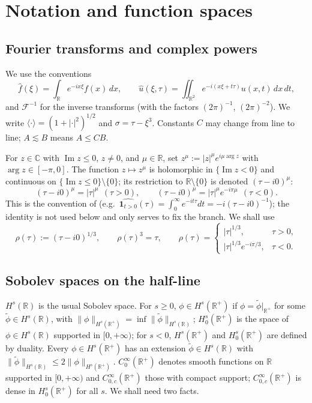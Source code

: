 \documentclass[10pt,reqno]{amsart}
\theoremstyle{remark}
\numberwithin{equation}{section}
\newcommand{\R}{\mathbb R}
\newcommand{\Com}{\mathbb{C}}
\newcommand{\ima}{\operatorname{Im}}
\newcommand{\lan}{\langle}
\newcommand{\ran}{\rangle}
\newcommand{\F}{\mathcal{F}}
\newcommand{\sig}{\sigma}
\begin{document}
\section{Notation and function spaces}\label{sec:spaces}

\subsection{Fourier transforms and complex powers}
We use the conventions
$$\widehat f(\xi)=\int_\R e^{-ix\xi}f(x)\,dx,\qquad \widehat u(\xi,\tau)=\iint_{\R^2}e^{-i(x\xi+t\tau)}u(x,t)\,dx\,dt,$$
and $\F^{-1}$ for the inverse transforms (with the factors $(2\pi)^{-1}$, $(2\pi)^{-2}$). We write $\lan\cdot\ran=(1+|\cdot|^2)^{1/2}$ and $\sig=\tau-\xi^3$. Constants $C$ may change from line to line; $A\lesssim B$ means $A\le CB$.

For $z\in\Com$ with $\ima z\le0$, $z\ne0$, and $\mu\in\R$, set $z^\mu:=|z|^\mu e^{i\mu\arg z}$ with $\arg z\in[-\pi,0]$. The function $z\mapsto z^\mu$ is holomorphic in $\{\ima z<0\}$ and continuous on $\{\ima z\le0\}\setminus\{0\}$; its restriction to $\R\setminus\{0\}$ is denoted $(\tau-i0)^\mu$:
\begin{equation}\label{eq:power}
(\tau-i0)^\mu=|\tau|^\mu\ \ (\tau>0),\qquad (\tau-i0)^\mu=|\tau|^\mu e^{-i\pi\mu}\ \ (\tau<0).
\end{equation}
This is the convention of \cite[(2.2)]{Holmer} (e.g.\ $\widehat{\mathbf 1_{t>0}}(\tau)=\int_0^\infty e^{-it\tau}dt=-i(\tau-i0)^{-1}$); the identity is not used below and only serves to fix the branch. We shall use
\begin{equation}\label{eq:rho}
\rho(\tau):=(\tau-i0)^{1/3},\qquad \rho(\tau)^3=\tau,\qquad \rho(\tau)=\begin{cases}|\tau|^{1/3}, & \tau>0,\\ |\tau|^{1/3}e^{-i\pi/3}, & \tau<0.\end{cases}
\end{equation}

\subsection{Sobolev spaces on the half-line}
 $H^s(\R)$ is the usual Sobolev space. For $s\ge0$, $\phi\in H^s(\R^+)$ if $\phi=\tilde\phi|_{\R^+}$ for some $\tilde\phi\in H^s(\R)$, with $\|\phi\|_{H^s(\R^+)}=\inf\|\tilde\phi\|_{H^s(\R)}$; $H^s_0(\R^+)$ is the space of $\phi\in H^s(\R)$ supported in $[0,+\infty)$; for $s<0$, $H^s(\R^+)$ and $H^s_0(\R^+)$ are defined by duality. Every $\phi\in H^s(\R^+)$ has an extension $\tilde\phi\in H^s(\R)$ with $\|\tilde\phi\|_{H^s(\R)}\le 2\|\phi\|_{H^s(\R^+)}$. $C_0^\infty(\R^+)$ denotes smooth functions on $\R$ supported in $[0,+\infty)$ and $C^\infty_{0,c}(\R^+)$ those with compact support; $C^\infty_{0,c}(\R^+)$ is dense in $H^s_0(\R^+)$ for all $s$. We shall need two facts.
\end{document}
